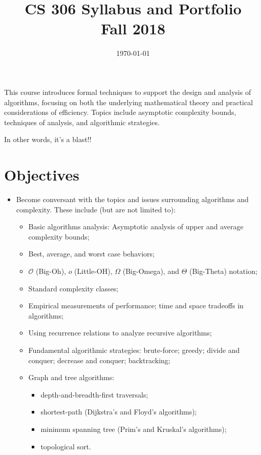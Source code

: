 \documentclass[12pt]{amsart}
\title{CS 306 Syllabus and Portfolio\\Fall 2018}
\date{\today}
\begin{document}
\maketitle
This course introduces formal techniques to support the design and
  analysis of algorithms, focusing on both the underlying mathematical
  theory and practical considerations of efficiency. Topics include
  asymptotic complexity bounds, techniques of analysis, and
  algorithmic strategies.

In other words, it's a blast!!

\section{Objectives}
\begin{itemize}
\item Become conversant with the topics and issues surrounding
    algorithms and complexity. These include (but are not limited to):
    \begin{itemize}
          \item Basic algorithms analysis: Asymptotic analysis of upper and
              average complexity bounds;
          \item Best, average, and worst case behaviors;
          \item $\mathcal{O}$ (Big-Oh), $o$ (Little-OH), $\Omega$ (Big-Omega), and
              $\Theta$ (Big-Theta) notation;
          \item Standard complexity classes;
          \item Empirical measurements of performance; time and space tradeoffs
              in algorithms;
          \item Using recurrence relations to analyze recursive algorithms;
          \item Fundamental algorithmic strategies: brute-force; greedy; divide
              and conquer; decrease and conquer; backtracking;
          \item Graph and tree algorithms: \begin{itemize}
          	\item depth-and-breadth-first traversals;
              	\item shortest-path (Dijkstra's and Floyd's algorithms);
		\item minimum spanning tree (Prim's and Kruskal's algorithms);
		\item topological sort.
	\end{itemize}
      \end{itemize}
\end{itemize}
\end{document}
